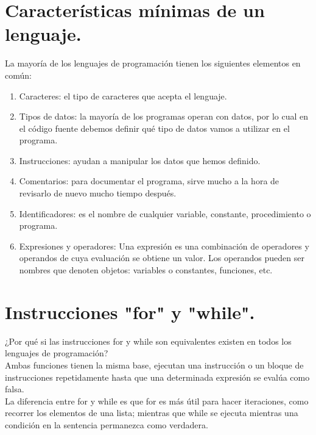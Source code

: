 \documentclass{article}
\begin{document}
\section*{Características mínimas de un lenguaje.}
La mayoría de los lenguajes de programación tienen los siguientes elementos en común:
\begin{enumerate}
	\item Caracteres: el tipo de caracteres que acepta el lenguaje. 
	\item Tipos de datos: la mayoría de los programas operan con datos, por lo cual en el código fuente debemos definir qué tipo de datos vamos a utilizar en el programa. 
	\item Instrucciones: ayudan a manipular los datos que hemos definido.
	\item Comentarios: para documentar el programa, sirve mucho a la hora de revisarlo de nuevo mucho tiempo después.
	\item Identificadores: es el nombre de cualquier variable, constante, procedimiento o programa.
	\item Expresiones y operadores: Una expresión es una combinación de operadores y operandos de cuya evaluación se obtiene un valor. Los operandos pueden ser nombres que denoten objetos: variables o constantes, funciones, etc. 
\end{enumerate}
\section*{Instrucciones "for" y "while".}
¿Por qué si las instrucciones for y while son equivalentes existen en todos los lenguajes de programación?\\Ambas funciones tienen la misma base, ejecutan una instrucción o un bloque de instrucciones repetidamente hasta que una determinada expresión se evalúa como falsa. \\La diferencia entre for y while es que for es más útil para hacer iteraciones, como recorrer los elementos de una lista; mientras que while se ejecuta mientras una condición en la sentencia permanezca como verdadera.
\end{document}

